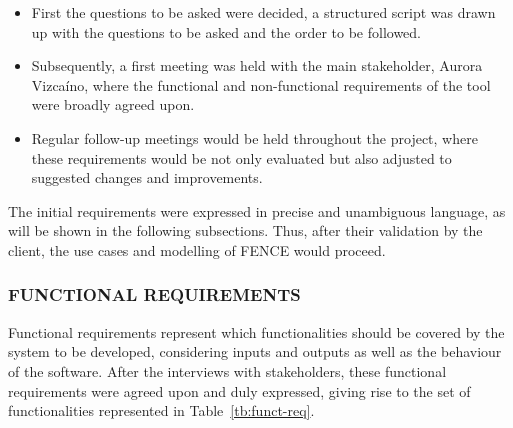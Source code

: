 \begin{itemize}
	\item First the questions to be asked were decided, a structured script was drawn up with the questions to be asked and the order to be followed.
	\item Subsequently, a first meeting was held with the main stakeholder, Aurora Vizcaíno, where the functional and non-functional requirements of the tool were broadly agreed upon.
	\item Regular follow-up meetings would be held throughout the project, where these requirements would be not only evaluated but also adjusted to suggested changes and improvements.
\end{itemize}

The initial requirements were expressed in precise and unambiguous language, as will be shown in the following subsections. Thus, after their validation by the client, the use cases and modelling of FENCE would proceed.

\subsubsection{FUNCTIONAL REQUIREMENTS}

Functional requirements represent which functionalities should be covered by the system to be developed, considering inputs and outputs as well as the behaviour of the software. After the interviews with stakeholders, these functional requirements were agreed upon and duly expressed, giving rise to the set of functionalities represented in Table~\ref{tb:funct-req}.

